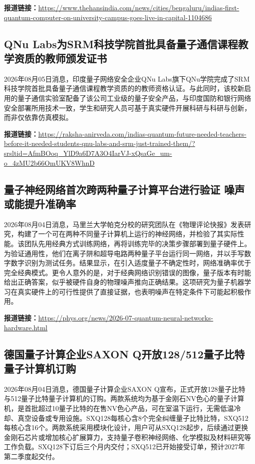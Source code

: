 \documentclass[12pt,a4paper]{ctexart}
\begin{document}
\noindent\textbf{报道链接：}\url{https://www.thehansindia.com/news/cities/bengaluru/indias-first-quantum-computer-on-university-campus-goes-live-in-capital-1104686}

\subsection{ QNu Labs为SRM科技学院首批具备量子通信课程教学资质的教师颁发证书 }

2026年08月05日消息，印度量子网络安全企业QNu Labs旗下QNu学院完成了SRM科技学院首批具备量子通信课程教学资质的的教师资格认证。与此同时，该校新启用的量子通信实验室配备了该公司工业级的量子安全产品，与印度国防和银行网络安全部署所用技术一致，学生和研究人员可基于真实硬件开展科研与科研与创新，而非仅依靠仿真模拟。

\noindent\textbf{报道链接：}\url{https://raksha-anirveda.com/indias-quantum-future-needed-teachers-before-it-needed-students-qnu-labs-and-srm-just-trained-them/?srsltid=AfmBOoq\_YlD9a6D7A3O4IarVJ-xQsaGe\_um-o\_4zMU2b66OmUKV8WhnD}

\subsection{ 量子神经网络首次跨两种量子计算平台进行验证 噪声或能提升准确率 }

2026年08月04日消息，马里兰大学帕克分校的研究团队在《物理评论快报》发表研究，构建了一个可在两种不同量子计算机上运行的神经网络，并检验了其实际性能。该团队先用经典方式训练网络，再将训练完毕的决策步骤部署到量子硬件上。为验证通用性，他们在离子阱和超导电路两种量子平台运行同一网络，并以手写数字数字识别为测试任务。结果显示，在引入适度量子不确定性时，网络准确率优于完全经典模式。更令人意外的是，对于经典网络识别错误的图像，量子版本有时能给出正确答案，似乎被硬件自身的物理噪声推向正确结果。这项研究为量子机器学习在真实硬件上的可行性提供了直接证据，也表明噪声在特定条件下可能起积极作用。

\noindent\textbf{报道链接：}\url{https://phys.org/news/2026-07-quantum-neural-networks-hardware.html}

\subsection{ 德国量子计算企业SAXON Q开放128/512量子比特量子计算机订购 }

2026年08月04日消息，德国量子计算企业SAXON Q宣布，正式开放128量子比特与512量子比特量子计算机的订购。两款系统均为基于金刚石NV色心的量子计算机，是首批超过10量子比特的在售NV色心产品，可在室温下运行，无需低温冷却、真空设备或专用设施。SXQ128每核心含8个完全纠缠量子比特比特，SXQ512每核心含16个。两款系统采用模块化设计，用户可从SXQ128起步，后续通过更换金刚石芯片或增加核心扩展算力，支持量子卷积神经网络、化学模拟及材料研究等工作负载。SXQ128下订后三个月内交付；SXQ512已开始接受订单，预计2027年第二季度起交付。
\end{document}
